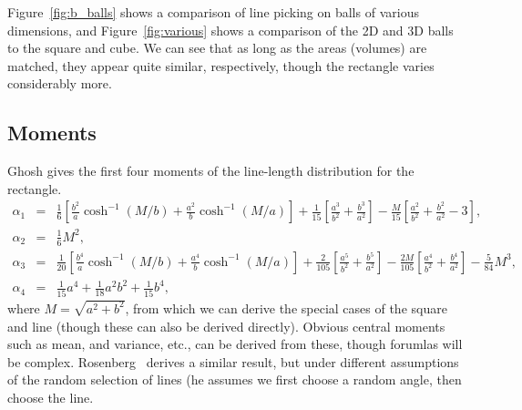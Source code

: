 \documentclass{article}
\begin{document}
Figure~\ref{fig:b_balls} shows a comparison of line picking on
balls of various dimensions, and Figure~\ref{fig:various} shows a
comparison of the 2D and 3D balls to the square and cube. We can see
that as long as the areas (volumes) are matched, they appear quite
similar, respectively, though the rectangle varies considerably more.




\subsection{Moments}

Ghosh \cite{b.ghosh51:_random_rect} gives the first four moments of
the line-length distribution for the rectangle.
\begin{eqnarray}
  \label{eq:rect_moments} 
  \alpha_1 & = & \frac{1}{6} \left[ 
                        \frac{b^2}{a} \cosh^{-1}\left( M/b \right) +
                        \frac{a^2}{b} \cosh^{-1}\left( M/a \right) 
                 \right]
                  + \frac{1}{15} \left[ \frac{a^3}{b^2} + \frac{b^3}{a^2} \right]
                  - \frac{M}{15} \left[ \frac{a^2}{b^2} + \frac{b^2}{a^2} -3 \right],
\\
  \alpha_2 & = & \frac{1}{6} M^2, \\
  \alpha_3 & = & \frac{1}{20} \left[ 
                        \frac{b^4}{a} \cosh^{-1}\left( M/b \right) +
                        \frac{a^4}{b} \cosh^{-1}\left( M/a \right) 
                 \right]
                  + \frac{2}{105} \left[ \frac{a^5}{b^2} + \frac{b^5}{a^2} \right]
                  - \frac{2M}{105} \left[ \frac{a^4}{b^2} + \frac{b^4}{a^2}\right]
                        - \frac{5}{84} M^3, 
\\
  \alpha_4 & = & \frac{1}{15} a^4 + \frac{1}{18} a^2 b^2 + \frac{1}{15} b^4,
\end{eqnarray}
where $M = \sqrt{a^2 + b^2}$, from which we can derive the special
cases of the square and line (though these can also be derived
directly). Obvious central moments such as mean, and variance, etc.,
can be derived from these, though forumlas will be
complex. Rosenberg~\cite{Rosenberg200499} derives a similar result,
but under different assumptions of the random selection of lines (he
assumes we first choose a random angle, then choose the line.
\end{document}
